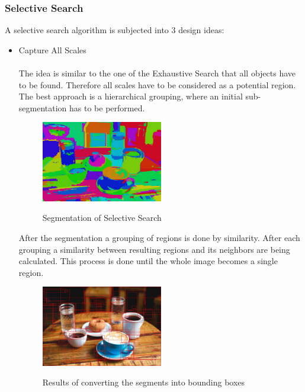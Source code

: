 \subsubsection{Selective Search}
A selective search algorithm is subjected into 3 design ideas:\\
\begin{itemize}
    \item Capture All Scales \\ \\
        The idea is similar to the one of the Exhaustive Search that all objects have to be found. Therefore all scales have to be
        considered as a potential region. The best approach is a hierarchical grouping, where an initial sub-segmentation has to
        be performed. \cite{selectivesearch}
        \begin{figure}[!hbt]
            \caption{Segmentation of Selective Search}
            \begin{center}
                \includegraphics[width=0.5\textwidth]{images/object_detection/breakfast_fnh.jpg}\cite{sssegmentationc}
            \end{center}
        \end{figure}
        After the segmentation a grouping of regions is done by similarity. After each grouping a similarity between
        resulting regions and its neighbors are being calculated. This process is done until the whole image becomes a single region.\cite{selectivesearch}
        \begin{figure}[!hbt]
            \caption{Results of converting the segments into bounding boxes}
            \begin{center}
                \includegraphics[width=0.5\textwidth]{images/object_detection/breakfast-top-200-proposals.jpg}\cite{sssegmentationbb}

\end{center}
\end{figure}
\end{itemize}
